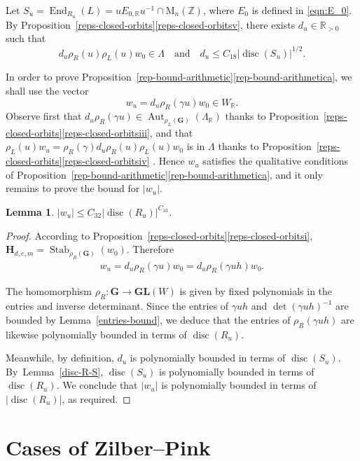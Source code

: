\documentclass[11pt]{article}
\numberwithin{equation}{section}
\newcommand{\bR}{\mathbb{R}}
\newcommand{\bZ}{\mathbb{Z}}
\newcommand{\gG}{\mathbf{G}}
\newcommand{\gGL}{\mathbf{GL}}
\newcommand{\gH}{\mathbf{H}}
\newcommand{\rM}{\mathrm{M}}
\DeclareMathOperator{\Aut}{Aut}
\DeclareMathOperator{\disc}{disc}
\DeclareMathOperator{\End}{End}
\DeclareMathOperator{\Stab}{Stab}
\newcommand{\abs}[1]{\lvert #1 \rvert}
\newtheorem{lemma}{Lemma}[section]
\begin{document}
Let $S_u = \End_{R_u}(L) = uE_{0,\bR}u^{-1} \cap \rM_n(\bZ)$, where $E_0$ is defined in \eqref{eqn:E_0}.
By Proposition~\ref{reps-closed-orbits}\eqref{reps-closed-orbitsv}, there exists $d_u \in \bR_{>0}$ such that
\[
d_u \rho_R(u) \rho_L(u) w_0 \in \Lambda \quad \text{and} \quad d_u \leq C_{18} \abs{\disc(S_u)}^{1/2}.
\]

In order to prove Proposition~\ref{rep-bound-arithmetic}\eqref{rep-bound-arithmetica}, we shall use the vector
\[
w_u = d_u\rho_R(\gamma u)w_0 \in W_\bR.
\]
Observe first that $d_u\rho_R(\gamma u) \in \Aut_{\rho_L(\gG)}(\Lambda_\bR)$ thanks to Proposition~\ref{reps-closed-orbits}\eqref{reps-closed-orbitsiii}, and that $\rho_L(u)w_u = \rho_R(\gamma) d_u \rho_R(u) \rho_L(u) w_0$ is in $\Lambda$ thanks to Proposition~\ref{reps-closed-orbits}\eqref{reps-closed-orbitsiv} .
Hence $w_u$ satisfies the qualitative conditions of Proposition~\ref{rep-bound-arithmetic}\eqref{rep-bound-arithmetica}, and it only remains to prove the bound for $\abs{w_u}$.

\begin{lemma} \label{length-wu}
$\abs{w_u} \leq C_{32} \abs{\disc(R_u)}^{C_{33}}$.
\end{lemma}

\begin{proof}
According to Proposition~\ref{reps-closed-orbits}\eqref{reps-closed-orbitsi}, $\gH_{d,e,m} = \Stab_{\rho_R(\gG)}(w_0)$.
Therefore
\begin{align*}
w_u = d_u\rho_R(\gamma u)w_0 = d_u\rho_R(\gamma uh)w_0.
\end{align*}

The homomorphism $\rho_R \colon \gG \to \gGL(W)$ is given by fixed polynomials in the entries and inverse determinant.
Since the entries of $\gamma uh$ and $\det(\gamma uh)^{-1}$ are bounded by Lemma~\ref{entries-bound}, we deduce that the entries of $\rho_R(\gamma uh)$ are likewise polynomially bounded in terms of $\disc(R_u)$.

Meanwhile, by definition, $d_u$ is polynomially bounded in terms of $\disc(S_u)$.
By~Lem\-ma~\ref{disc-R-S}, $\disc(S_u)$ is polynomially bounded in terms of $\disc(R_u)$.
We conclude that $\abs{w_u}$ is polynomially bounded in terms of $\abs{\disc(R_u)}$, as required.
\end{proof}

\section{Cases of Zilber--Pink}\label{cases-of-ZP}
\end{document}
